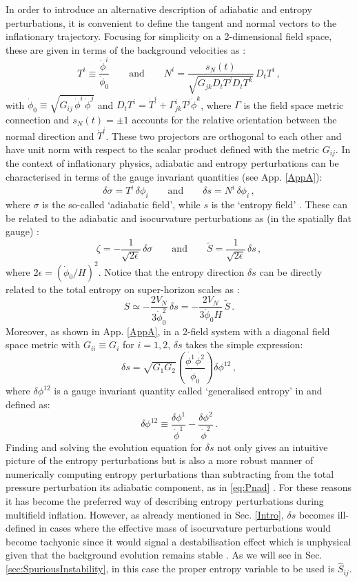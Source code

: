 \documentclass[a4paper,11pt]{article}
\def\be{\begin{equation}}
\def\ee{\end{equation}}
\begin{document}
In order to introduce an alternative description of adiabatic and entropy perturbations, it is convenient to define the tangent and normal vectors to the inflationary trajectory. Focusing for simplicity on a 2-dimensional field space, these are given in terms of the background velocities as \cite{Achucarro:2010da,Cremonini:2010sv}:
\be
T^i\equiv \frac{\dot\phi^i}{\dot\phi_0}\qquad\text{and}\qquad N^i=\frac{s_N(t)}{\sqrt{G_{jk} D_t T^j D_t T^k}}\, D_t T^i\,,
\label{eq:TN}
\ee
with $\dot\phi_0\equiv\sqrt{G_{ij}\,\dot\phi^i\,\dot\phi^j}$ and $D_t T^i=\dot T^i +\Gamma_{jk}^i T^j\dot\phi^k$, where $\Gamma$ is the field space metric connection and $s_N(t)=\pm1$ accounts for the relative orientation between the normal direction and $\dot T^i$. These two projectors are orthogonal to each other and have unit norm with respect to the scalar product defined with the metric $G_{ij}$. In the context of inflationary physics, adiabatic and entropy perturbations can be characterised in terms of the gauge invariant quantities (see App. \ref{AppA}): 
\be
\delta \sigma= T^i \,\delta \phi_i\qquad \text{and}\qquad\delta s= N^i\, \delta \phi_i\,,
\label{deltas}
\ee
where $\sigma$ is the so-called `adiabatic field', while $s$ is the `entropy field' \cite{Gordon:2000hv}. These can be related to the adiabatic and isocurvature perturbations as (in the spatially flat gauge) \cite{Achucarro:2010da}:
\be
\zeta=-\frac{1}{\sqrt{2\epsilon}}\,\delta \sigma\qquad\text{and}\qquad \tilde{S}=\frac{1}{\sqrt{2\epsilon}}\,\delta s\,,
\label{eq:RSTN}
\ee
where $2\epsilon = \left(\dot\phi_0/H\right)^2$. Notice that the entropy direction $\delta s$ can be directly related to the total entropy on super-horizon scales as \cite{Gordon:2000hv}:
\be
S\simeq - \frac{2 V_N}{3\dot\phi_0^2}\, \delta s = - \frac{2 V_N}{3\dot\phi_0 H}\, \tilde S\,.
\label{Sds}
\ee
Moreover, as shown in App. \ref{AppA}, in a 2-field system with a diagonal field space metric with $G_{ii} \equiv G_i$ for $i=1,2$, $\delta s$ takes the simple expression:
\be
\delta s  = \sqrt{G_1 G_2} \left(\frac{\dot{\phi^1} \dot{\phi^2}}{\dot\phi_0}\right) \delta\phi^{12} \,,
\label{eq:deltas}
\ee
where $\delta\phi^{12}$ is a gauge invariant quantity called `generalised entropy' in \cite{Gordon:2000hv} and defined as:
\be
\delta \phi^{12}\equiv\frac{\delta \phi^1}{\dot{\phi}^1}-\frac{\delta \phi^2}{\dot\phi^2}\,.
\label{dphi12}
\ee
Finding and solving the evolution equation for $\delta s$ not only gives an intuitive picture of the entropy perturbations but is also a more robust manner of numerically computing entropy perturbations than subtracting from the total pressure perturbation its adiabatic component, as in \eqref{eq:Pnad} \cite{Gordon:2000hv, Price:2014xpa}. For these reasons it has become the preferred way of describing entropy perturbations during multifield inflation. However, as already mentioned in Sec. \ref{Intro}, $\delta s$ becomes ill-defined in cases where the effective mass of isocurvature perturbations would become tachyonic since it would signal a destabilisation effect which is unphysical given that the background evolution remains stable \cite{Cicoli:2018ccr,Cicoli:2019ulk}. As we will see in Sec. \ref{sec:SpuriousInstability}, in this case the proper entropy variable to be used is $\hat{S}_{ij}$.
\end{document}
